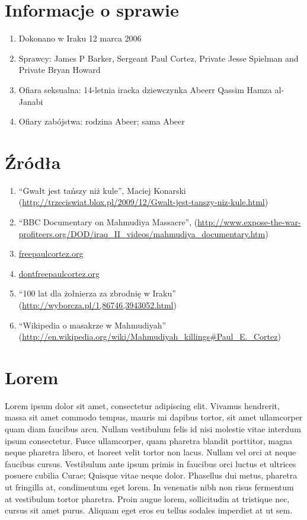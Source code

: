 \documentclass[12pt,a4paper]{article}
\begin{document}
\section{Informacje o sprawie}

\begin{enumerate}
\item Dokonano w Iraku 12 marca 2006
\item Sprawcy: James P Barker, Sergeant Paul Cortez, Private Jesse Spielman and Private Bryan Howard
\item Ofiara seksualna: 14-letnia iracka dziewczynka Abeerr Qassim Hamza al-Janabi
\item Ofiary zabójstwa: rodzina Abeer; sama Abeer
\end{enumerate}

\section{Źródła}


\begin{enumerate}
\item ``Gwałt jest tańszy niż kule'', Maciej Konarski (\url{http://trzeciswiat.blox.pl/2009/12/Gwalt-jest-tanszy-niz-kule.html})
\item ``BBC Documentary on Mahmudiya Massacre'',
  (\url{http://www.expose-the-war-profiteers.org/DOD/iraq_II_videos/mahmudiya_documentary.htm})
\item \url{freepaulcortez.org}
\item \url{dontfreepaulcortez.org}
\item ``100 lat dla żołnierza za zbrodnię w Iraku'' (\url{http://wyborcza.pl/1,86746,3943052.html})
\item ``Wikipedia o masakrze w Mahmudiyah'' (\url{http://en.wikipedia.org/wiki/Mahmudiyah_killings#Paul_E._Cortez})
\end{enumerate}

\section{Lorem}

Lorem ipsum dolor sit amet, consectetur adipiscing elit. Vivamus
hendrerit, massa sit amet commodo tempus, mauris mi dapibus tortor,
sit amet ullamcorper quam diam faucibus arcu. Nullam vestibulum felis
id nisi molestie vitae interdum ipsum consectetur. Fusce ullamcorper,
quam pharetra blandit porttitor, magna neque pharetra libero, et
laoreet velit tortor non lacus. Nullam vel orci at neque faucibus
cursus. Vestibulum ante ipsum primis in faucibus orci luctus et
ultrices posuere cubilia Curae; Quisque vitae neque dolor. Phasellus
dui metus, pharetra ut fringilla at, condimentum eget lorem. In
venenatis nibh non risus fermentum at vestibulum tortor pharetra.
Proin augue lorem, sollicitudin at tristique nec, cursus sit amet
purus. Aliquam eget eros eu tellus sodales imperdiet at ut sem.
\end{document}
